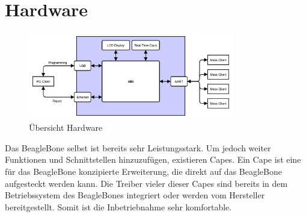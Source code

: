 
\section{Hardware}
\label{section_Hardware}

\begin{figure}[H]
\begin{center}
\includegraphics[width=0.8\textwidth ]{img/general/UebersichtMaster.pdf}
\caption{Übersicht Hardware}
\label{figure_AufbauBleagleBone}
\end{center}
\end{figure}

Das BeagleBone selbst ist bereits sehr Leistungsstark. Um jedoch weiter Funktionen und Schnittstellen hinzuzufügen, existieren Capes. Ein Cape ist eine für das BeagleBone konzipierte Erweiterung, die direkt auf das BeagleBone aufgesteckt werden kann. Die Treiber vieler dieser Capes sind bereits in dem Betriebssystem des BeagleBones integriert oder werden vom Hersteller bereitgestellt. Somit ist die Inbetriebnahme sehr komfortable.



